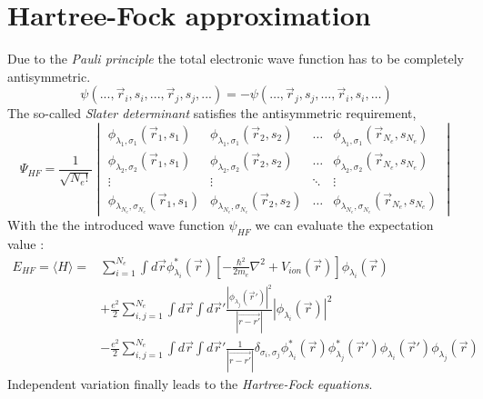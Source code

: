 		
		
	
	\section{Hartree-Fock approximation}
		Due to the \textit{Pauli principle} the total electronic wave function has to be completely antisymmetric.
		\begin{equation}
			\psi(..., \vec r_i, s_i, ..., \vec r_j, s_j, ...) = 	- \psi(\dots, \vec r_j, s_j,  \dots, \vec r_i, s_i, \dots) 
		\end{equation}
		The so-called \textit{Slater determinant} satisfies the antisymmetric requirement,
		\begin{equation}
			\Psi_{HF} = \frac{1}{\sqrt{N_e !}} 
			\begin{vmatrix}
				\phi_{\lambda_1, \sigma_1} (\vec r_1, s_1) & \phi_{\lambda_1, \sigma_1} (\vec r_2, s_2) & \dots & \phi_{\lambda_1, \sigma_1} (\vec r_{N_e}, s_{N_e}) \\
				\phi_{\lambda_2, \sigma_2} (\vec r_1, s_1) & \phi_{\lambda_2, \sigma_2} (\vec r_2, s_2) & \dots & \phi_{\lambda_2, \sigma_2} (\vec r_{N_e}, s_{N_e}) \\
				\vdots & \vdots & \ddots & \vdots \\
				\phi_{\lambda_{N_e}, \sigma_{N_e}} (\vec r_1, s_1) & \phi_{\lambda_{N_e}, \sigma_{N_e}} (\vec r_2, s_2) & \dots & \phi_{\lambda_{N_e}, \sigma_{N_e}} (\vec r_{N_e}, s_{N_e})
			\end{vmatrix}
		\end{equation}
		With the the introduced wave function $\psi_{HF}$ we can evaluate the expectation value :
		\begin{equation}
			\begin{split}
				E_{HF} = \langle H \rangle =& \sum_{i=1}^{N_e} \int d \vec r \phi_{\lambda_i}^*(\vec r) [- \frac{\hbar ^2}{2m_e} \nabla^2 + V_{ion}(\vec r)] \phi_{\lambda_i}(\vec r) \\ &+ \frac{e^2}{2} \sum_{i,j =1}^{N_e} \int d \vec r \int d \vec r' \frac{|\phi_{\lambda_j}(\vec r')|^2}{|\vec{r - r'}|} |\phi_{\lambda_i}(\vec r)|^2 \\
				&- \frac{e^2}{2} \sum_{i,j = 1}^{N_e} \int d \vec r \int d \vec r' \frac{1}{|\vec{r - r'}|} \delta_{\sigma_i, \sigma_j} \phi_{\lambda_i}^*(\vec r) \phi_{\lambda_j}^*(\vec r')\phi_{\lambda_i}(\vec r') \phi_{\lambda_j}(\vec r) 
			\end{split}
		\end{equation}
		Independent variation finally leads to the \textit{Hartree-Fock equations}.
